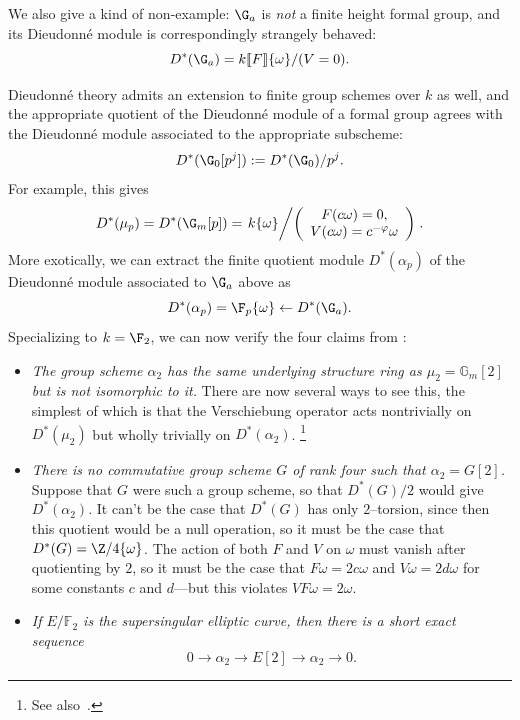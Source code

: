 \begin{example}
We also give a kind of non-example: \(\G_a\) is \emph{not} a finite height formal group, and its Dieudonn\'e module is correspondingly strangely behaved: \[D^*(\G_a) = k\ps{F}\{\omega\} / (V = 0).\]
\end{example}

\begin{example}\label{WorkedAlpha2Example}
Dieudonn\'e theory admits an extension to finite group schemes over \(k\) as well, and the appropriate quotient of the Dieudonn\'e module of a formal group agrees with the Dieudonn\'e module associated to the appropriate subscheme: \[D^*(\G_0[p^j]) := D^*(\G_0) / p^j.\]
For example, this gives \[D^*(\mu_p) = D^*(\G_m[p]) = \left.k\{\omega\} \middle/\left(\begin{array}{c} F(c\omega) = 0, \\ V(c\omega) = c^{-\phi} \omega \end{array}\right)\right. .\]
More exotically, we can extract the finite quotient module \(D^*(\alpha_p)\) of the Dieudonn\'e module associated to \(\G_a\) above as \[D^*(\alpha_p) = \F_p\{\omega\} \leftarrow D^*(\G_a).\]
Specializing to $k = \F_2$, we can now verify the four claims from :
\begin{itemize}
\item \textit{The group scheme \(\alpha_2\) has the same underlying structure ring as \(\mu_2 = \mathbb{G}_m[2]\) but is not isomorphic to it.}
      There are now several ways to see this, the simplest of which is that the Verschiebung operator acts nontrivially on \(D^*(\mu_2)\) but wholly trivially on \(D^*(\alpha_2)\).%
\footnote{%
      See also~\cite[Example 8.5]{StricklandFPFP}.
}
\item \textit{There is no commutative group scheme \(G\) of rank four such that \(\alpha_2 = G[2]\).}
      Suppose that \(G\) were such a group scheme, so that \(D^*(G) / 2\) would give \(D^*(\alpha_2)\).
      It can't be the case that \(D^*(G)\) has only \(2\)--torsion, since then this quotient would be a null operation, so it must be the case that \(D^*(G) = \Z/4\{\omega\}\).
      The action of both \(F\) and \(V\) on \(\omega\) must vanish after quotienting by \(2\), so it must be the case that \(F\omega = 2c\omega\) and \(V\omega = 2d\omega\) for some constants \(c\) and \(d\)---but this violates \(VF\omega = 2\omega\).
\item \textit{If \(E/\mathbb{F}_2\) is the supersingular elliptic curve, then there is a short exact sequence \[0 \rightarrow \alpha_2 \rightarrow E[2] \rightarrow \alpha_2 \rightarrow 0.\]
}
\end{itemize}
\end{example}
